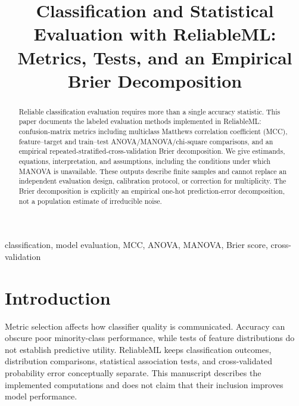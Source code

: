 \documentclass[conference]{IEEEtran}
\title{Classification and Statistical Evaluation with ReliableML: Metrics, Tests, and an Empirical Brier Decomposition}
\author{
\jabulaniauthor
\and
\martinchanzauthor
\and
\oloratoauthor
\and
\mfundoauthor
}
\begin{document}
\maketitle

\begin{abstract}
Reliable classification evaluation requires more than a single accuracy statistic. This paper documents the labeled evaluation methods implemented in ReliableML: confusion-matrix metrics including multiclass Matthews correlation coefficient (MCC), feature--target and train--test ANOVA/MANOVA/chi-square comparisons, and an empirical repeated-stratified-cross-validation Brier decomposition. We give estimands, equations, interpretation, and assumptions, including the conditions under which MANOVA is unavailable. These outputs describe finite samples and cannot replace an independent evaluation design, calibration protocol, or correction for multiplicity. The Brier decomposition is explicitly an empirical one-hot prediction-error decomposition, not a population estimate of irreducible noise.
\end{abstract}

\begin{IEEEkeywords}
classification, model evaluation, MCC, ANOVA, MANOVA, Brier score, cross-validation
\end{IEEEkeywords}

\section{Introduction}
Metric selection affects how classifier quality is communicated. Accuracy can obscure poor minority-class performance, while tests of feature distributions do not establish predictive utility. ReliableML keeps classification outcomes, distribution comparisons, statistical association tests, and cross-validated probability error conceptually separate. This manuscript describes the implemented computations and does not claim that their inclusion improves model performance.
\end{document}
